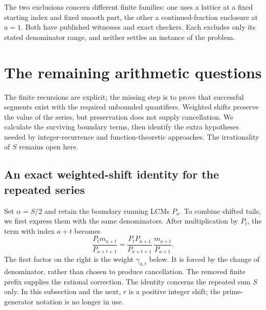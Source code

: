 \documentclass[11pt]{article}
\theoremstyle{remark}
\theoremstyle{plain}
\begin{document}
The two exclusions concern different finite families: one uses a
lattice at a fixed starting index and fixed smooth part, the other a continued-fraction
enclosure at $a=1$.  Both have published witnesses and exact checkers.
Each excludes only its stated denominator range, and neither settles an
instance of the problem.

\section{The remaining arithmetic questions}\label{long269:sec:open}

The finite recursions are explicit; the missing step is to prove that
successful segments exist with the required unbounded quantifiers.
Weighted shifts preserve the value of the series, but preservation does
not supply cancellation. We calculate the surviving boundary terms,
then identify the extra hypotheses needed by integer-recurrence and
function-theoretic approaches. The irrationality of $S$ remains open here.

\subsection{An exact weighted-shift identity for the repeated series}
\label{long269:sec:weighted-shifts}
Set $\alpha=S/2$ and retain the boundary running LCMs $P_a$. To combine
shifted tails, we first express them with the same denominators. After
multiplication by $P_t$, the term with index $a+t$ becomes
\[
 \frac{P_t m_{a+t}}{P_{a+t+1}}
 =\frac{P_tP_{a+1}}{P_{a+t+1}}\,
   \frac{m_{a+t}}{P_{a+1}}.
\]
The first factor on the right is the weight $\gamma_{a,t}$ below. It is
forced by the change of denominator, rather than chosen to produce
cancellation. The removed finite prefix supplies the rational correction.
The identity concerns the repeated sum $S$ only. In this subsection and
the next, $r$ is a positive integer shift; the prime-generator notation is
no longer in use.
\end{document}
